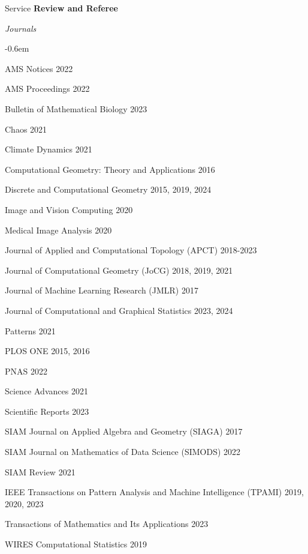 \documentclass{resume} %
\begin{document}
\begin{rSection}{Service}
\textbf{Review and Referee}

\textit{Journals}
\begin{list}{}{\leftmargin=1em}
   \itemsep -0.6em \vspace{-0.5em} %
   \item AMS Notices \hfill 2022
   \item AMS Proceedings \hfill 2022
   \item Bulletin of Mathematical Biology \hfill 2023
   \item Chaos \hfill 2021
   \item Climate Dynamics \hfill 2021
   \item Computational Geometry: Theory and Applications \hfill 2016
   \item Discrete and Computational Geometry \hfill 2015, 2019, 2024
   \item Image and Vision Computing \hfill 2020
   \item Medical Image Analysis \hfill 2020
   \item Journal of Applied and Computational Topology (APCT) \hfill
   2018-2023
   \item Journal of Computational Geometry (JoCG) \hfill 2018, 2019, 2021
   \item Journal of Machine Learning Research (JMLR) \hfill 2017
   \item  Journal of Computational and Graphical Statistics \hfill 2023, 2024
   \item Patterns \hfill 2021
   \item PLOS ONE \hfill 2015, 2016
   \item PNAS \hfill 2022
   \item Science Advances \hfill 2021
   \item Scientific Reports \hfill 2023
   \item SIAM Journal on Applied Algebra and Geometry (SIAGA) \hfill 2017
   \item SIAM Journal on Mathematics of Data Science (SIMODS) \hfill 2022
   \item SIAM Review \hfill 2021
   \item IEEE Transactions on Pattern Analysis and Machine Intelligence (TPAMI) \hfill 2019, 2020, 2023
   \item Transactions of Mathematics and Its Applications
\hfill 2023
   \item WIRES Computational Statistics \hfill 2019

\end{list}
\end{rSection}
\end{document}
